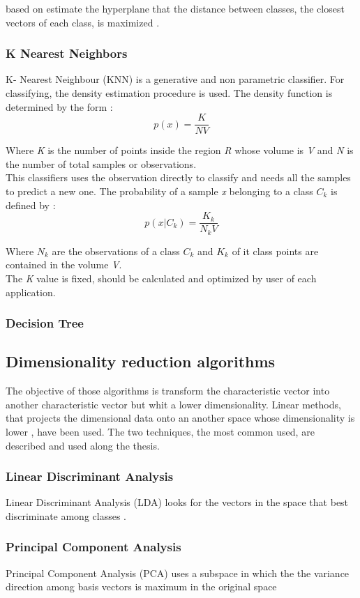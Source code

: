 based on estimate the hyperplane that the distance between classes, the closest vectors of each class, is maximized \cite{SVM1, MachineLearning}.

\subsubsection{K Nearest Neighbors}
K- Nearest Neighbour (KNN) is a generative and non parametric classifier. For classifying, the density estimation procedure is used. The density function is determined by the form \cite{MachineLearning}:
\begin{equation}
p(x) = \frac{K}{N V}
\end{equation}

Where \textit{K} is the number of points inside the region \textit{R} whose volume is \textit{V} and \textit{N} is the number of total samples or observations.\\

This classifiers uses the observation directly to classify and needs all the samples to predict a new one. The probability of a sample \textit{x} belonging to a class \textit{$C_k$} is defined by \cite{MachineLearning}:
\begin{equation}
p(x|C_k) = \frac{K_k}{N_k V}
\end{equation}

Where $N_k$ are the observations of a class $C_k$ and $K_k$ of it class points are contained in the volume \textit{V}.\\

The \textit{K} value is fixed, should be calculated and optimized by user of each application.\\

\subsubsection{Decision Tree}

\subsection{Dimensionality reduction algorithms}
The objective of those algorithms is transform the characteristic vector into another characteristic vector but whit a lower dimensionality. Linear methods, that projects the dimensional data onto an another space whose dimensionality is lower \cite{Duda}, have been used. The two techniques, the most common used, are described and used along the thesis.\\
\subsubsection{Linear Discriminant Analysis}
Linear Discriminant Analysis (LDA) looks for the vectors in the space that best discriminate among classes \cite{PCAvsLDA}.

\subsubsection{Principal Component Analysis}
Principal Component Analysis (PCA) uses a subspace in which the the variance direction among basis vectors is maximum in the original space \cite{PCAvsLDA}
